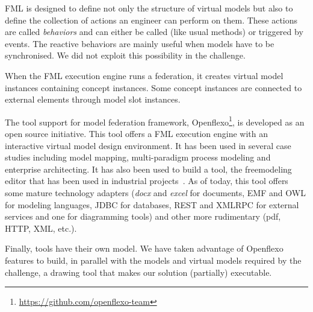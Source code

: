 FML is designed to define not only the structure of virtual models but
also to define the collection of actions an engineer can perform on
them. These actions are called \emph{behaviors} and can either be called (like usual methods) or triggered by events. The reactive behaviors are mainly useful when models have to be synchronised. We did not
exploit this possibility in the challenge.


When the FML execution engine runs a federation, it creates virtual
model instances containing concept instances. Some concept instances
are connected to external elements through model slot instances.


The tool support for model federation framework,
Openflexo\footnote{\url{https://github.com/openflexo-team}}, is
developed as an open source initiative. This tool offers a FML
execution engine with an interactive virtual model design environment.
It has been used in several case studies including model mapping,
multi-paradigm process modeling and enterprise architecting. It has
also been used to build a tool, the freemodeling editor that has been
used in industrial projects~\cite{models2016-freemodel}. As of today, this tool
offers some mature technology adapters (\emph{docx} and \emph{excel}
for documents, EMF and OWL for modeling languages, JDBC for databases,
REST and XMLRPC for external services and one for diagramming tools)
and other more rudimentary (pdf, HTTP, XML, etc.).

Finally, tools have their own model. We have taken advantage of
Openflexo features to build, in parallel with the models and virtual
models required by the challenge, a drawing tool that makes our
solution (partially) executable.
